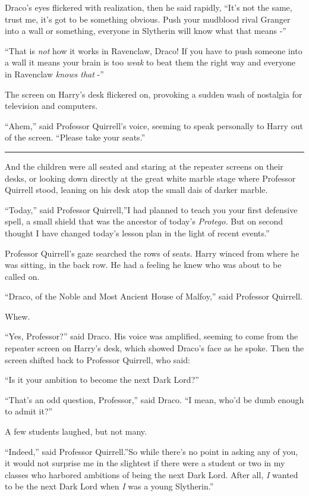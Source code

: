 Draco's eyes flickered with realization, then he said rapidly, ``It's
not the same, trust me, it's got to be something obvious. Push your
mudblood rival Granger into a wall or something, everyone in Slytherin
will know what that means -''

``That is \emph{not} how it works in Ravenclaw, Draco! If you have to
push someone into a wall it means your brain is too \emph{weak} to beat
them the right way and everyone in Ravenclaw \emph{knows that} -''

The screen on Harry's desk flickered on, provoking a sudden wash of
nostalgia for television and computers.

``Ahem,'' said Professor Quirrell's voice, seeming to speak personally
to Harry out of the screen. ``Please take your seats.''

\begin{center}\rule{3in}{0.4pt}\end{center}

And the children were all seated and staring at the repeater screens on
their desks, or looking down directly at the great white marble stage
where Professor Quirrell stood, leaning on his desk atop the small dais
of darker marble.

``Today,'' said Professor Quirrell,''I had planned to teach you your
first defensive spell, a small shield that was the ancestor of today's
\emph{Protego.} But on second thought I have changed today's lesson plan
in the light of recent events.''

Professor Quirrell's gaze searched the rows of seats. Harry winced from
where he was sitting, in the back row. He had a feeling he knew who was
about to be called on.

``Draco, of the Noble and Most Ancient House of Malfoy,'' said Professor
Quirrell.

Whew.

``Yes, Professor?'' said Draco. His voice was amplified, seeming to come
from the repeater screen on Harry's desk, which showed Draco's face as
he spoke. Then the screen shifted back to Professor Quirrell, who said:

``Is it your ambition to become the next Dark Lord?''

``That's an odd question, Professor,'' said Draco. ``I mean, who'd be
dumb enough to admit it?''

A few students laughed, but not many.

``Indeed,'' said Professor Quirrell.''So while there's no point in
asking any of you, it would not surprise me in the slightest if there
were a student or two in my classes who harbored ambitions of being the
next Dark Lord. After all, \emph{I} wanted to be the next Dark Lord when
\emph{I} was a young Slytherin.''

